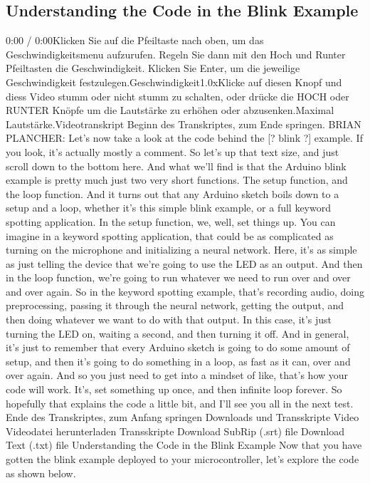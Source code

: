 \subsection{Understanding the Code in the Blink Example}

0:00 / 0:00Klicken Sie auf die Pfeiltaste nach oben, um das Geschwindigkeitsmenu aufzurufen. Regeln Sie dann mit den Hoch und Runter Pfeiltasten die Geschwindigkeit. Klicken Sie Enter, um die jeweilige Geschwindigkeit festzulegen.Geschwindigkeit1.0xKlicke auf diesen Knopf und diess Video stumm oder nicht stumm zu schalten, oder drücke die HOCH oder RUNTER Knöpfe um die Lautstärke zu erhöhen oder abzusenken.Maximal Lautstärke.Videotranskript
Beginn des Transkriptes, zum Ende springen.
BRIAN PLANCHER: Let's now take a look at the code behind the [? blink ?]
example.
If you look, it's actually mostly a comment.
So let's up that text size, and just scroll down to the bottom here.
And what we'll find is that the Arduino blink example is pretty much just two
very short functions.
The setup function, and the loop function.
And it turns out that any Arduino sketch boils down to a setup and a loop,
whether it's this simple blink example, or a full keyword spotting application.
In the setup function, we, well, set things up.
You can imagine in a keyword spotting application, that
could be as complicated as turning on the microphone
and initializing a neural network.
Here, it's as simple as just telling the device that we're
going to use the LED as an output.
And then in the loop function, we're going
to run whatever we need to run over and over and over again.
So in the keyword spotting example, that's
recording audio, doing preprocessing, passing it through the neural network,
getting the output, and then doing whatever
we want to do with that output.
In this case, it's just turning the LED on, waiting a second,
and then turning it off.
And in general, it's just to remember that every Arduino sketch is
going to do some amount of setup, and then it's
going to do something in a loop, as fast as it can, over and over again.
And so you just need to get into a mindset of like,
that's how your code will work.
It's, set something up once, and then infinite loop forever.
So hopefully that explains the code a little bit,
and I'll see you all in the next test.
Ende des Transkriptes, zum Anfang springen
Downloads und Transskripte
Video
Videodatei herunterladen
Transskripte
Download SubRip (.srt) file
Download Text (.txt) file
Understanding the Code in the Blink Example
Now that you have gotten the blink example deployed to your microcontroller, let's explore the code as shown below.

